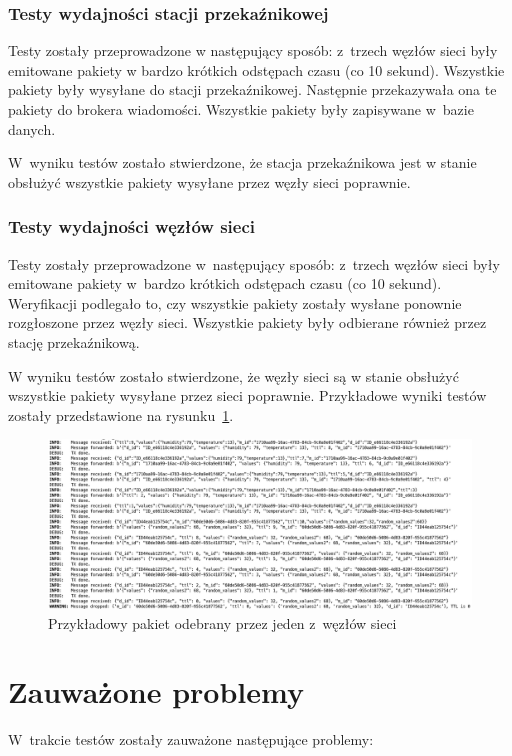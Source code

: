 \subsubsection{Testy wydajności stacji przekaźnikowej}
Testy zostały przeprowadzone w następujący sposób: z~trzech węzłów sieci były emitowane pakiety w bardzo krótkich odstępach czasu (co 10 sekund).
Wszystkie pakiety były wysyłane do stacji przekaźnikowej.
Następnie przekazywała ona te pakiety do brokera wiadomości.
Wszystkie pakiety były zapisywane w~bazie danych.

W~wyniku testów zostało stwierdzone, że stacja przekaźnikowa jest w stanie obsłużyć wszystkie pakiety wysyłane przez węzły sieci poprawnie.

\subsubsection{Testy wydajności węzłów sieci}
Testy zostały przeprowadzone w~następujący sposób: z~trzech węzłów sieci były emitowane pakiety w~bardzo krótkich odstępach czasu (co 10 sekund).
Weryfikacji podlegało to, czy wszystkie pakiety zostały wysłane ponownie rozgłoszone przez węzły sieci.
Wszystkie pakiety były odbierane również przez stację przekaźnikową.

W wyniku testów zostało stwierdzone, że węzły sieci są w stanie obsłużyć wszystkie pakiety wysyłane przez sieci poprawnie.
Przykładowe wyniki testów zostały przedstawione na rysunku~\ref{rys:odbijanie-pakietu}.

\begin{figure}[b!]
    \begin{center}
        \includegraphics[width=13cm]{pic/odbijanie-pakietu.png}
    \end{center}
    \caption{Przykładowy pakiet odebrany przez jeden z~węzłów sieci}\label{rys:odbijanie-pakietu}
\end{figure}

\section{Zauważone problemy}
W~trakcie testów zostały zauważone następujące problemy:
